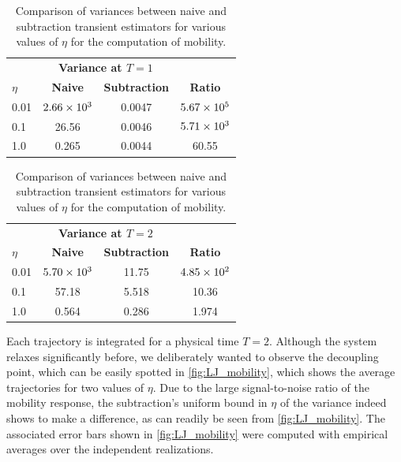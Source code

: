 %
\begin{table}[h!]
\begin{subtable}[h]{0.45\textwidth}
\centering
\begin{tabular}{lccc}
\toprule
 & \multicolumn{2}{c}{\textbf{Variance at $T=1$}} &  \\
\cmidrule(lr){2-3}
 $\eta$ & \textbf{Naive} & \textbf{Subtraction} & \textbf{Ratio} \\
\midrule
0.01 & ${2.66}\times 10^{3}$ & 0.0047 & ${5.67}\times 10^{5}$ \\
0.1  & 26.56   & 0.0046 & ${5.71}\times 10^{3}$  \\
1.0  & 0.265    & 0.0044 & 60.55    \\
\bottomrule
\end{tabular}
\caption{Data at $T=1$ (start of decoupling)}
\end{subtable}%
\hfill
\begin{subtable}[h]{0.45\textwidth}
\centering
\begin{tabular}{lccc}
\toprule
 & \multicolumn{2}{c}{\textbf{Variance at $T=2$}} &  \\
\cmidrule(lr){2-3}
 $\eta$ & \textbf{Naive} & \textbf{Subtraction} & \textbf{Ratio} \\
\midrule
0.01 & ${5.70}\times 10^{3}$ & 11.75 & ${4.85}\times 10^{2}$ \\
0.1  & 57.18   & 5.518  & 10.36  \\
1.0  & 0.564    & 0.286  & 1.974   \\
\bottomrule
\end{tabular}
\caption{Data at final time $T=2$ (total decoupling)}
\end{subtable}
\caption{Comparison of variances between naive and subtraction transient estimators for various values of $\eta$ for the computation of mobility.}
\label{table:LJ_mobility}
\end{table}
%
Each trajectory is integrated for a physical time $T=2$. Although the system relaxes significantly before, we deliberately wanted to observe the decoupling point, which can be easily spotted in \cref{fig:LJ_mobility}, which shows the average trajectories for two values of $\eta$. Due to the large signal-to-noise ratio of the mobility response, the subtraction's uniform bound in $\eta$ of the variance indeed shows to make a difference, as can readily be seen from \cref{fig:LJ_mobility}. The associated error bars shown in \cref{fig:LJ_mobility} were computed with empirical averages over the independent realizations.

